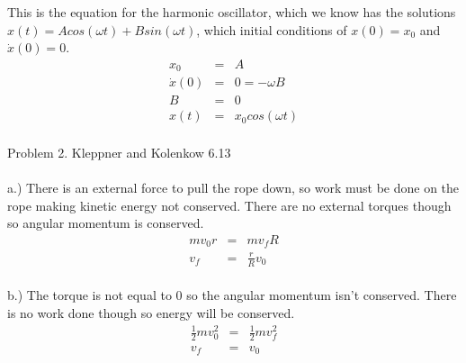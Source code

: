 \documentclass[11pt]{amsart}
\begin{document}
This is the equation for the harmonic oscillator, which we know has the solutions $x(t)=Acos(\omega{t})+Bsin(\omega{t})$, which initial conditions of $x(0)=x_{0}$ and $\dot{x}(0)=0$. \\
\begin{eqnarray*}
x_{0} &=& A \\
\dot{x}(0) &=& 0 = -\omega{B} \\
B &=& 0 \\
x(t) &=& x_{0}cos(\omega{t}) 
\end{eqnarray*} \\

Problem 2. Kleppner and Kolenkow 6.13 \\ \\
a.) There is an external force to pull the rope down, so work must be done on the rope making kinetic energy not conserved. There are no external torques though so angular momentum is conserved. \\
\begin{eqnarray*}
mv_{0}r &=& mv_{f}R \\
v_{f} &=& \frac{r}{R}v_{0} 
\end{eqnarray*} \\
b.) The torque is not equal to 0 so the angular momentum isn't conserved. There is no work done though so energy will be conserved. \\
\begin{eqnarray*}
\frac{1}{2}mv_{0}^{2} &=& \frac{1}{2}mv_{f}^{2} \\
v_{f} &=& v_{0} 
\end{eqnarray*} \\
\end{document}
